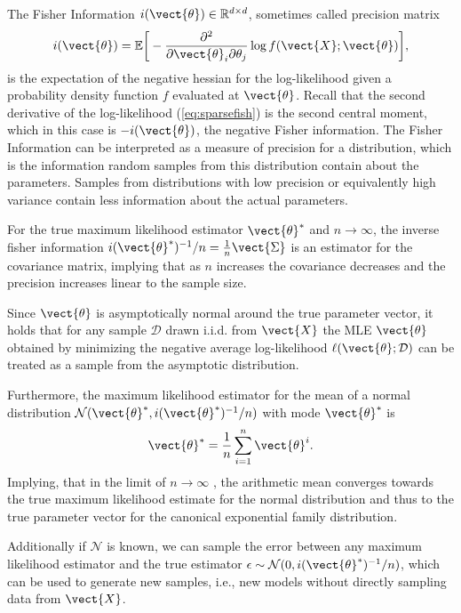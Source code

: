         The Fisher Information $i(\vect{\theta}) \in \mathbb{R}^{d \times d}$, sometimes called precision matrix
        \begin{equation*}
            i(\vect{\theta}) = \mathbb{E}\bigg[- \frac{\partial^2}{\partial \vect{\theta}_i \partial \theta_j} \log f(\vect{X}; \vect{\theta})\bigg] ,
        \end{equation*} 
        is the expectation of the negative hessian for the log-likelihood given a probability density function $f$ evaluated at $\vect{\theta}$.
        Recall that the second derivative of the log-likelihood (\autoref{eq:sparsefish}) is the second central moment, which in this case is $-i(\vect{\theta})$, the negative Fisher information.
        The Fisher Information can be interpreted as a measure of precision for a distribution, which is the information random samples from this distribution contain about the parameters.
        Samples from distributions with low precision or equivalently high variance contain less information about the actual parameters.

        For the true maximum likelihood estimator $\vect{\theta}^*$  and $n \rightarrow \infty$, the inverse fisher information $i(\vect{\theta}^*)^{-1}/ n = \frac{1}{n} \vect{\Sigma}$ is an estimator for the covariance matrix, implying that as $n$ increases the covariance decreases and the precision increases linear to the sample size.

        Since $\vect{\theta}$ is asymptotically normal around the true parameter vector, it holds that for any sample $\mathcal{D}$ drawn i.i.d. from $\vect{X}$ the MLE $\vect{\theta}$ obtained by minimizing the negative average log-likelihood $\ell(\vect{\theta}; \mathcal{D})$ can be treated as a sample from the asymptotic distribution.

        Furthermore, the maximum likelihood estimator for the mean of a normal distribution $\mathcal{N}(\vect{\theta}^*, i(\vect{\theta}^*)^{-1}/n)$ with mode $\vect{\theta}^*$ is
        \begin{equation}
            \vect{\theta}^* = \frac{1}{n} \sum_{i=1}^n \vect{\theta}^{i}.
        \end{equation}
        Implying, that in the limit of $n \rightarrow \infty$ , the arithmetic mean converges towards the true maximum likelihood estimate for the normal distribution and thus to the true parameter vector for the canonical exponential family distribution.
        
        Additionally if $\mathcal{N}$ is known, we can sample the error between any maximum likelihood estimator and the true estimator $\epsilon \sim \mathcal{N}(0, i(\vect{\theta}^*)^{-1}/n)$, which can be used to generate new samples, i.e., new models without directly sampling data from $\vect{X}$.

